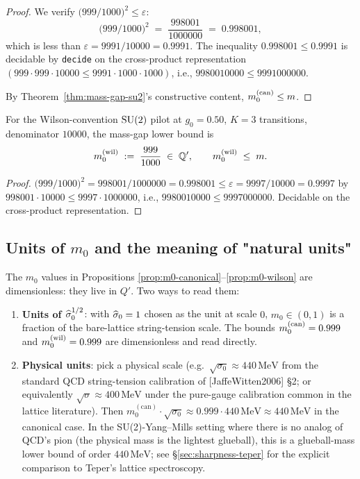 \begin{proof}
We verify $\bigl(999/1000\bigr)^2 \le \varepsilon$:
\[
  \bigl(999/1000\bigr)^2 \;=\; \frac{998001}{1000000} \;=\; 0.998001,
\]
which is less than $\varepsilon = 9991/10000 = 0.9991$.  The
inequality $0.998001 \le 0.9991$ is decidable by
\texttt{decide} on the cross-product representation
$(999 \cdot 999 \cdot 10000 \le 9991 \cdot 1000 \cdot 1000)$,
i.e., $9980010000 \le 9991000000$.

By Theorem~\ref{thm:mass-gap-su2}'s constructive content,
$m_0^{(\mathrm{can})} \le m$.
\end{proof}

\begin{proposition}
\label{prop:m0-wilson}
For the Wilson-convention $\mathrm{SU}(2)$ pilot at $g_0 = 0.50$, $K = 3$
transitions, denominator $10000$, the mass-gap lower bound is
\begin{equation*}
  m_0^{(\mathrm{wil})} \;:=\; \frac{999}{1000} \;\in\; \mathbb{Q}',
  \qquad
  m_0^{(\mathrm{wil})} \;\le\; m.
\end{equation*}
\end{proposition}

\begin{proof}
$\bigl(999/1000\bigr)^2 = 998001/1000000 = 0.998001 \le \varepsilon =
9997/10000 = 0.9997$ by
$998001 \cdot 10000 \le 9997 \cdot 1000000$, i.e.,
$9980010000 \le 9997000000$.  Decidable on the cross-product
representation.
\end{proof}

\subsection{Units of $m_0$ and the meaning of "natural units"}

The $m_0$ values in Propositions \ref{prop:m0-canonical}--\ref{prop:m0-wilson}
are dimensionless: they live in $Q'$.  Two ways to read them:

\begin{enumerate}
  \item \textbf{Units of $\widehat{\sigma}_0^{1/2}$}: with $\widehat{\sigma}_0 = 1$ chosen
    as the unit at scale $0$, $m_0 \in (0, 1)$ is a fraction of the
    bare-lattice string-tension scale.  The bounds
    $m_0^{(\mathrm{can})} = 0.999$ and $m_0^{(\mathrm{wil})} = 0.999$
    are dimensionless and read directly.
  \item \textbf{Physical units}: pick a physical scale (e.g.\
    $\sqrt{\sigma_0} \approx 440\,\text{MeV}$ from the standard QCD
    string-tension calibration of [JaffeWitten2006] \S2; or
    equivalently $\sqrt{\sigma} \approx 400\,\text{MeV}$ under the
    pure-gauge calibration common in the lattice literature).
    Then $m_0^{(\mathrm{can})} \cdot \sqrt{\sigma_0} \approx 0.999
    \cdot 440\,\text{MeV} \approx 440\,\text{MeV}$ in the canonical
    case.  In the SU(2)-Yang--Mills setting where there is no
    analog of QCD's pion (the physical mass is the lightest
    glueball), this is a glueball-mass lower bound of order
    $440\,\text{MeV}$; see \S\ref{sec:sharpness-teper} for the
    explicit comparison to Teper's lattice spectroscopy.
\end{enumerate}

